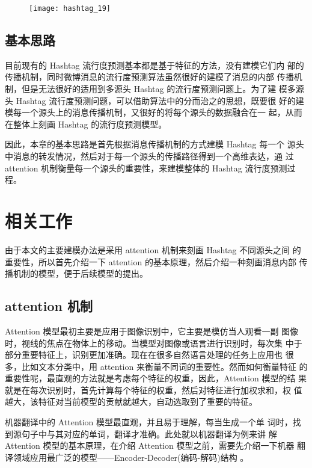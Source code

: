 \begin{figure}[H]
    \centering
    \texttt{[image: hashtag\_19]}
    \label{fig:4_2}
\end{figure}

\subsection{基本思路}


目前现有的 Hashtag 流行度预测基本都是基于特征的方法，没有建模它们内 部的传播机制，同时微博消息的流行度预测算法虽然很好的建模了消息的内部 传播机制，但是无法很好的适用到多源头 Hashtag 的流行度预测问题上。为了建 模多源头 Hashtag 流行度预测问题，可以借助算法中的分而治之的思想，既要很 好的建模每一个源头上的消息传播机制，又很好的将每个源头的数据融合在一 起，从而在整体上刻画 Hashtag 的流行度预测模型。

因此，本章的基本思路是首先根据消息传播机制的方式建模 Hashtag 每一个 源头中消息的转发情况，然后对于每一个源头的传播路径得到一个高维表达，通 过 attention 机制衡量每一个源头的重要性，来建模整体的 Hashtag 流行度预测过 程。

\section{相关工作}
由于本文的主要建模办法是采用 attention 机制来刻画 Hashtag 不同源头之间 的重要性，所以首先介绍一下 attention 的基本原理，然后介绍一种刻画消息内部 传播机制的模型，便于后续模型的提出。
\subsection{attention 机制}

Attention 模型最初主要是应用于图像识别中，它主要是模仿当人观看一副 图像时，视线的焦点在物体上的移动。当模型对图像或语言进行识别时，每次集 中于部分重要特征上，识别更加准确。现在在很多自然语言处理的任务上应用也 很多，比如文本分类中，用 attention 来衡量不同词的重要性。然而如何衡量特征 的重要性呢，最直观的方法就是考虑每个特征的权重，因此，Attention 模型的结 果就是在每次识别时，首先计算每个特征的权重，然后对特征进行加权求和，权 值越大，该特征对当前模型的贡献就越大，自动选取到了重要的特征。

机器翻译中的 Attention 模型最直观\citep{Luong2015Effective}，并且易于理解，每当生成一个单 词时，找到源句子中与其对应的单词，翻译才准确。此处就以机器翻译为例来讲 解 Attention 模型的基本原理，在介绍 Attention 模型之前，需要先介绍一下机器 翻译领域应用最广泛的模型——Encoder-Decoder(编码-解码)结构 \citep{Bahdanau2014Neural}。

